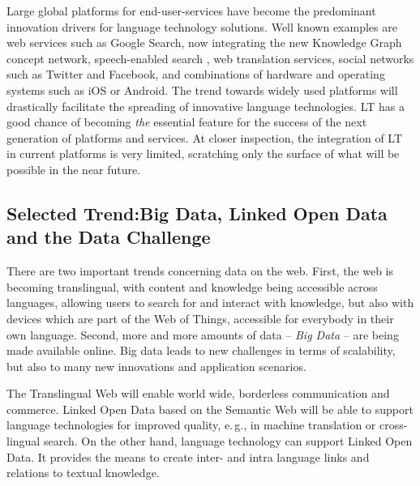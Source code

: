 \documentclass[10pt, plain]{../../metanetpaper}
\begin{document}
\begin{multicols}{2}
Large global platforms for end-user-services have become the predominant innovation drivers for language technology solutions. Well known examples are web services such as Google Search, now integrating the new Knowledge Graph concept network, speech-enabled search \cite{meisel12}, web translation services, social networks such as Twitter and Facebook, and combinations of hardware and operating systems such as iOS or Android. The trend towards widely used platforms will drastically facilitate the spreading of innovative language technologies. LT has a good chance of becoming \emph{the} essential feature for the success of the next generation of platforms and services. At closer inspection, the integration of LT in current platforms is very limited, scratching only the surface of what will be possible in the near future.

\subsection[Selected Trend: Big Data, Linked Open Data and the Data Challenge]{Selected Trend:\newline Big Data, Linked Open Data and the Data Challenge}
\label{sec:linked-data-open}

There are two important trends concerning data on the web. First, the web is becoming translingual, with content and knowledge being accessible across languages, allowing users to search for and interact with knowledge, but also with devices which are part of the Web of Things, accessible for everybody in their own language. Second, more and more amounts of data -- \emph{Big Data} -- are being made available online. Big data leads to new challenges in terms of scalability, but also to many new innovations and application scenarios. 

The Translingual Web will enable world wide, borderless communication and commerce. Linked Open Data based on the Semantic Web will be able to support language technologies for improved quality, e.\,g., in machine translation or cross-lingual search. On the other hand, language technology can support Linked Open Data. It provides the means to create inter- and intra language links and relations to textual knowledge.


\end{multicols}
\end{document}
